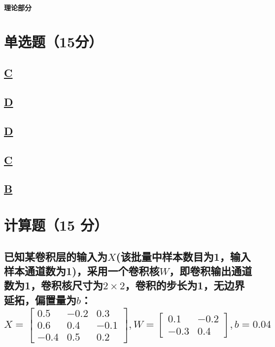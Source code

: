 \documentclass[a4paper]{article}
\begin{document}
\courseheader
{}
\vspace{3mm}
\centerline{\textbf{\Large{理论部分}}}

\section{单选题（15分）}
\subsection{\underline{C}}

\subsection{\underline{D}}

\subsection{\underline{D}}

\subsection{\underline{C}}

\subsection{\underline{B}}

\section{计算题（15 分）}
\subsection{
已知某卷积层的输入为$X$(该批量中样本数目为1，输入样本通道数为1)，采用一个卷积核$W$，即卷积输出通道数为1，卷积核尺寸为$2\times 2$，卷积的步长为1，无边界延拓，偏置量为$b$：
$$X=\left[ \begin{array}{ccc}
    0.5 & -0.2 & 0.3 \\
    0.6 & 0.4 & -0.1 \\
    -0.4 & 0.5 & 0.2
\end{array}\right],
W=\left[ \begin{array}{cc}
    0.1 & -0.2  \\
    -0.3 & 0.4
\end{array}\right], b=0.04$$
}
\end{document}
